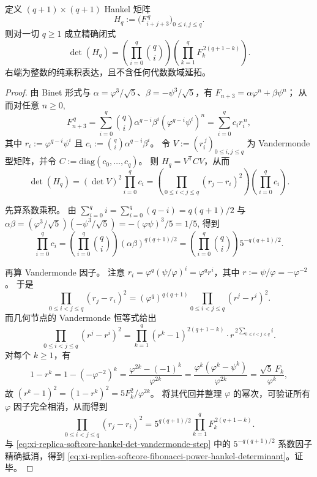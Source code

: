 \begin{theorem}\label{thm:xi-replica-softcore-fibonacci-power-hankel-determinant}
定义 \((q+1)\times(q+1)\) Hankel 矩阵
\[
H_q:=\bigl(F_{i+j+3}^{\,q}\bigr)_{0\le i,j\le q}.
\]
则对一切 \(q\ge 1\) 成立精确闭式
\begin{equation}\label{eq:xi-replica-softcore-fibonacci-power-hankel-determinant}
\det(H_q)
=\left(\prod_{i=0}^{q}\binom{q}{i}\right)
\left(\prod_{k=1}^{q}F_k^{\,2(q+1-k)}\right).
\end{equation}
右端为整数的纯乘积表达，且不含任何代数数域延拓。
\end{theorem}
\begin{proof}
由 Binet 形式与 \(\alpha=\varphi^3/\sqrt5\)、\(\beta=-\psi^3/\sqrt5\)，有
\(
F_{n+3}=\alpha\varphi^n+\beta\psi^n
\)；
从而对任意 \(n\ge 0\),
\[
F_{n+3}^{\,q}
=\sum_{i=0}^{q}\binom{q}{i}\alpha^{q-i}\beta^{i}(\varphi^{q-i}\psi^{i})^{n}
=\sum_{i=0}^{q}c_i r_i^{\,n},
\]
其中 \(r_i:=\varphi^{q-i}\psi^{i}\) 且 \(c_i:=\binom{q}{i}\alpha^{q-i}\beta^{i}\)。
令 \(V:=(r_i^{\,j})_{0\le i,j\le q}\) 为 Vandermonde 型矩阵，并令 \(C:=\mathrm{diag}(c_0,\dots,c_q)\)。
则 \(H_q=V^{\mathsf T}CV\)，从而
\begin{equation}\label{eq:xi-replica-softcore-hankel-det-vandermonde-step}
\det(H_q)=(\det V)^2\prod_{i=0}^{q}c_i
=\left(\prod_{0\le i<j\le q}(r_j-r_i)^2\right)\left(\prod_{i=0}^{q}c_i\right).
\end{equation}

先算系数乘积。
由 \(\sum_{i=0}^{q} i=\sum_{i=0}^{q}(q-i)=q(q+1)/2\) 与
\(
\alpha\beta=(\varphi^3/\sqrt5)(-\psi^3/\sqrt5)=-(\varphi\psi)^3/5=1/5
\),
得到
\[
\prod_{i=0}^{q}c_i
=\left(\prod_{i=0}^{q}\binom{q}{i}\right)(\alpha\beta)^{q(q+1)/2}
=\left(\prod_{i=0}^{q}\binom{q}{i}\right)5^{-q(q+1)/2}.
\]

再算 Vandermonde 因子。
注意 \(r_i=\varphi^q(\psi/\varphi)^i=\varphi^q r^i\)，其中 \(r:=\psi/\varphi=-\varphi^{-2}\)。
于是
\[
\prod_{0\le i<j\le q}(r_j-r_i)^2
=(\varphi^q)^{q(q+1)}\prod_{0\le i<j\le q}(r^j-r^i)^2.
\]
而几何节点的 Vandermonde 恒等式给出
\[
\prod_{0\le i<j\le q}(r^j-r^i)^2
=\prod_{k=1}^{q}(r^k-1)^{2(q+1-k)}\cdot r^{\,2\sum_{0\le i<j\le q}i}.
\]
对每个 \(k\ge 1\)，有
\[
1-r^k
=1-(-\varphi^{-2})^k
=\frac{\varphi^{2k}-(-1)^k}{\varphi^{2k}}
=\frac{\varphi^k(\varphi^k-\psi^k)}{\varphi^{2k}}
=\frac{\sqrt5\,F_k}{\varphi^k},
\]
故
\(
(r^k-1)^2=(1-r^k)^2=5F_k^2/\varphi^{2k}
\)。
将其代回并整理 \(\varphi\) 的幂次，可验证所有 \(\varphi\) 因子完全相消，从而得到
\[
\prod_{0\le i<j\le q}(r_j-r_i)^2
=5^{q(q+1)/2}\prod_{k=1}^{q}F_k^{\,2(q+1-k)}.
\]
与 \eqref{eq:xi-replica-softcore-hankel-det-vandermonde-step} 中的 \(5^{-q(q+1)/2}\) 系数因子精确抵消，得到 \eqref{eq:xi-replica-softcore-fibonacci-power-hankel-determinant}。证毕。
\end{proof}

